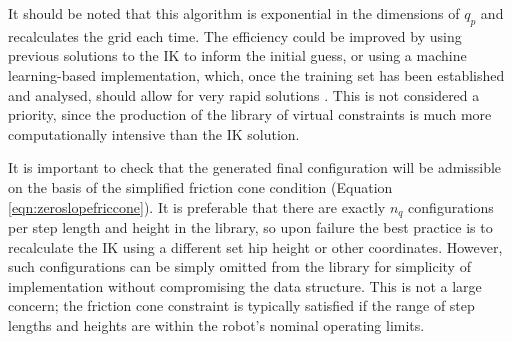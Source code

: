 
It should be noted that this algorithm is exponential in the dimensions of $q_p$ and recalculates the grid each time. The efficiency could be improved by using previous solutions to the IK to inform the initial guess, or using a machine learning-based implementation, which, once the training set has been established and analysed, should allow for very rapid solutions \cite{jang1993anfis}. This is not considered a priority, since the production of the library of virtual constraints is much more computationally intensive than the IK solution.

It is important to check that the generated final configuration will be admissible on the basis of the simplified friction cone condition (Equation \ref{eqn:zeroslopefriccone}). It is preferable that there are exactly $n_q$ configurations per step length and height in the library, so upon failure the best practice is to recalculate the IK using a different set hip height or other coordinates. However, such configurations can be simply omitted from the library for simplicity of implementation without compromising the data structure. This is not a large concern; the friction cone constraint is typically satisfied if the range of step lengths and heights are within the robot's nominal operating limits.

